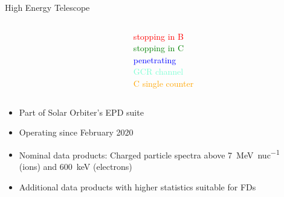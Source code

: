 \documentclass[10pt,aspectratio=169,usenames,dvipsnames]{beamer}
\begin{document}
\begin{frame}{High Energy Telescope}
    \begin{columns}
    	\begin{column}{0.7\textwidth}
    		\centering
		    
		\end{column}
		\begin{column}{0.25\textwidth}
			\footnotesize \textcolor{red}{stopping in B}\\ \textcolor{green}{stopping in C} \\ \textcolor{blue}{penetrating}\\ \textcolor{Aquamarine}{GCR channel} \\ \textcolor{orange}{C single counter}
		\end{column}
	\end{columns}
    \begin{columns}
        \begin{column}{0.45\textwidth}
            \begin{itemize}
                \item Part of Solar Orbiter's EPD suite 
                \item Operating since February 2020
                \item Nominal data products: Charged particle spectra above \SI{7}{\mega\electronvolt\per nuc} (ions) and \SI{600}{\kilo\electronvolt} (electrons)
                \item Additional data products with higher statistics suitable for FDs
            \end{itemize}
        \end{column}
        \begin{column}{0.45\textwidth}
            
        \end{column}
    \end{columns}
\end{frame}
\end{document}
